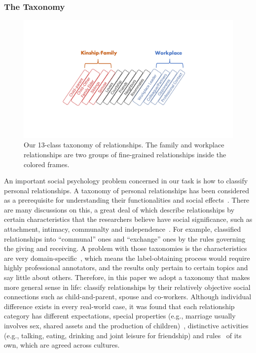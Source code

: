 \subsubsection*{The Taxonomy}
\begin{figure}[th]
	\centering
	\includegraphics[width=0.99\columnwidth]{taxonomy.pdf}
	\caption{Our 13-class taxonomy of relationships. 
The family and workplace relationships are two groups of 
fine-grained relationships inside the colored frames.}
	\label{fig:taxonomy}
\end{figure}
An important social psychology problem concerned in our task is 
how to classify personal relationships. A taxonomy of personal 
relationships has been considered as a prerequisite for 
understanding their functionalities and 
social effects~\cite{taxonomy2}. 
There are many discussions on this, a great deal of 
which describe relationships by certain 
characteristics that the researchers believe have social significance, 
such as attachment, intimacy, communalty and independence~\cite{class-SDT, encyclopedia}. For example, \citeauthor{class1} 
classified relationships into ``communal'' ones and ``exchange'' ones by 
the rules governing the giving and receiving. 
A problem with those taxonomies is the characteristics 
are very domain-specific~\cite{taxonomy2}, 
which means the label-obtaining process would require highly 
professional annotators, and the results only pertain to
certain topics and say little about others. 
Therefore, in this paper we adopt a taxonomy that makes 
more general sense in life: classify relationships by their 
relatively objective social connections such as child-and-parent, 
spouse and co-workers. 
Although individual difference exists in every real-world case, 
it was found that  each relationship category has different expectations, 
special properties (e.g., marriage usually involves sex, 
shared assets and the production of children)~\cite{class-property}, 
distinctive activities (e.g., talking, eating, drinking and 
joint leisure for friendship) and 
rules~\cite{class-rules} of its own, which are agreed across cultures.

